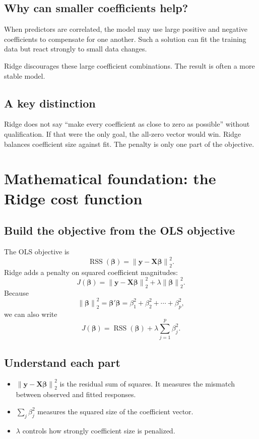 \documentclass[11pt,a4paper]{article}
\numberwithin{equation}{section}
\theoremstyle{remark}
\newcommand{\X}{\mathbf X}
\newcommand{\y}{\mathbf y}
\newcommand{\bta}{\boldsymbol{\beta}}
\newcommand{\RSS}{\operatorname{RSS}}
\newcommand{\norm}[1]{\left\lVert #1\right\rVert_2}
\begin{document}
\subsection{Why can smaller coefficients help?}
When predictors are correlated, the model may use large positive and negative
coefficients to compensate for one another. Such a solution can fit the
training data but react strongly to small data changes.

Ridge discourages these large coefficient combinations. The result is often
a more stable model.

\subsection{A key distinction}
Ridge does not say ``make every coefficient as close to zero as possible''
without qualification. If that were the only goal, the all-zero vector would
win. Ridge balances coefficient size against fit. The penalty is only one
part of the objective.

\section{Mathematical foundation: the Ridge cost function}

\subsection{Build the objective from the OLS objective}
The OLS objective is
\[
\RSS(\bta)=\norm{\y-\X\bta}^2.
\]
Ridge adds a penalty on squared coefficient magnitudes:
\[
\boxed{
J(\bta)=\norm{\y-\X\bta}^2+\lambda\norm{\bta}^2.
}
\]
Because
\[
\norm{\bta}^2=\bta'\bta
=\beta_1^2+\beta_2^2+\cdots+\beta_p^2,
\]
we can also write
\[
\boxed{
J(\bta)=\RSS(\bta)+
\lambda\sum_{j=1}^{p}\beta_j^2.
}
\]

\subsection{Understand each part}
\begin{itemize}
\item $\norm{\y-\X\bta}^2$ is the residual sum of squares. It measures
the mismatch between observed and fitted responses.
\item $\sum_j\beta_j^2$ measures the squared size of the coefficient vector.
\item $\lambda$ controls how strongly coefficient size is penalized.
\end{itemize}
\end{document}
